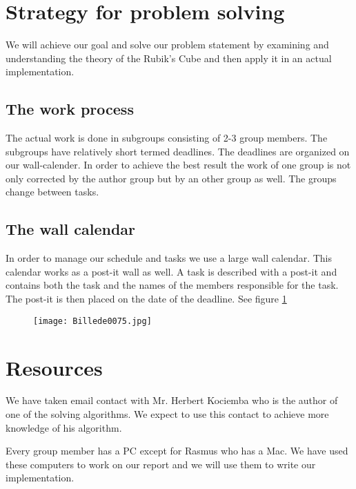\documentclass{article}
\begin{document}
\section{Strategy for problem solving}

We will achieve our goal and solve our problem statement by examining and understanding the theory of the Rubik's Cube and then apply it in an actual implementation. 

\subsection{The work process}
The actual work is done in subgroups consisting of 2-3 group members.  The subgroups have relatively short termed deadlines. The deadlines are organized on our wall-calender. In order to achieve the best result the work of one group is not only corrected by the author group but by an other group as well. The groups change between tasks. 

\subsection{The wall calendar}
In order to manage our schedule and tasks we use a large wall calendar. This calendar works as a post-it wall as well. A task is described with a post-it and contains both the task and the names of the members responsible for the task. The post-it is then placed on the date of the deadline. See figure \ref{fig:wall}
\begin{figure}[hp]
	\centering
		\texttt{[image: Billede0075.jpg]}
		
		\label{fig:wall}
\end{figure}


\section{Resources}
We have taken email contact with Mr. Herbert Kociemba who is the author of one of the solving algorithms. We expect to use this contact to achieve more knowledge of his algorithm.

Every group member has a PC except for Rasmus who has a Mac. We have used these computers to work on our report and we will use them to write our implementation.
\end{document}
